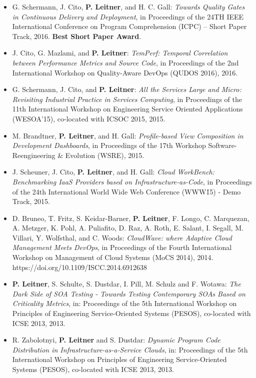 \documentclass[paper=letter,fontsize=11pt]{scrartcl} %
\begin{document}
\begin{itemize}
	\item G. Schermann, J. Cito, \textbf{P. Leitner}, and H. C. Gall: \emph{Towards Quality Gates in Continuous Delivery and Deployment}, in Proceedings of the 24TH IEEE International Conference on Program Comprehension (ICPC) – Short Paper Track, 2016. \textbf{Best Short Paper Award}. 
	\item J. Cito, G. Mazlami, and \textbf{P. Leitner}: \emph{TemPerf: Temporal Correlation between Performance Metrics and Source Code}, in Proceedings of the 2nd International Workshop on Quality-Aware DevOps (QUDOS 2016), 2016. 
    \item G. Schermann, J. Cito, and \textbf{P. Leitner}: \emph{All the Services Large and Micro: Revisiting Industrial Practice in Services Computing}, in Proceedings of the 11th International Workshop on Engineering Service Oriented Applications (WESOA’15), co-located with ICSOC 2015, 2015. 
    \item M. Brandtner, \textbf{P. Leitner}, and H. Gall: \emph{Profile-based View Composition in Development Dashboards}, in Proceedings of the 17th Workshop Software-Reengineering \& Evolution (WSRE), 2015.
  \item J. Scheuner, J. Cito, \textbf{P. Leitner}, and H. Gall: \emph{Cloud WorkBench: Benchmarking IaaS Providers based on Infrastructure-as-Code}, in Proceedings of the 24th International World Wide Web Conference (WWW\'15) - Demo Track, 2015. 
 \item D. Bruneo, T. Fritz, S. Keidar-Barner, \textbf{P. Leitner}, F. Longo, C. Marquezan, A. Metzger, K. Pohl, A. Puliafito, D. Raz, A. Roth, E. Salant, I. Segall, M. Villari, Y. Wolfsthal, and C. Woods: \emph{CloudWave: where Adaptive Cloud Management Meets DevOps}, in Proceedings of the Fourth International Workshop on Management of Cloud Systems (MoCS 2014), 2014. https://doi.org/10.1109/ISCC.2014.6912638
 \item \textbf{P. Leitner}, S. Schulte, S. Dustdar, I. Pill, M. Schulz and F. Wotawa: \emph{The Dark Side of SOA Testing - Towards Testing Contemporary SOAs Based on Criticality Metrics}, in: Proceedings of the 5th International Workshop on Principles of Engineering Service-Oriented Systems (PESOS), co-located with ICSE 2013, 2013. 
\item R. Zabolotnyi, \textbf{P. Leitner} and S. Dustdar: \emph{Dynamic Program Code Distribution in Infrastructure-as-a-Service Clouds}, in: Proceedings of the 5th International Workshop on Principles of Engineering Service-Oriented Systems (PESOS), co-located with ICSE 2013, 2013. \\ 

\end{itemize}
\end{document}
